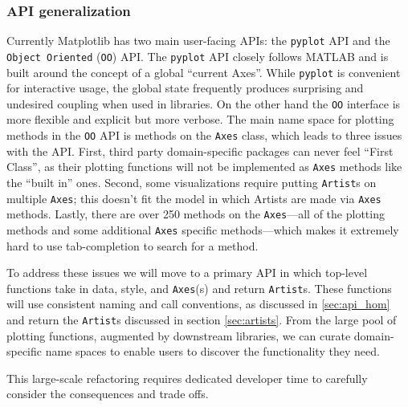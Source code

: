 \documentclass[11pt,letterpaper]{article}  %
\begin{document}
\subsubsection{API generalization}
\label{sec:api_gen}
Currently Matplotlib has two main user-facing APIs: the
\texttt{pyplot} API and the \texttt{Object Oriented} (\texttt{OO})
API.  The \texttt{pyplot} API closely follows MATLAB and is built
around the concept of a global ``current Axes''.
While
\texttt{pyplot} is convenient for interactive usage, the global
state frequently produces surprising and undesired coupling when used
in libraries.
On the other hand the \texttt{OO} interface is more flexible and
explicit but more verbose.
The main name space for plotting methods in the \texttt{OO} API is
methods on the \texttt{Axes} class, which leads to three issues with
the API.
First, third party domain-specific packages can never feel ``First
Class'', as their plotting functions will not be implemented as
\texttt{Axes} methods like the ``built in'' ones.
Second, some visualizations require putting \texttt{Artist}s on
multiple \texttt{Axes}; this doesn't fit the model in which Artists
are made via \texttt{Axes} methods.
Lastly, there are over 250 methods on the \texttt{Axes}---all of the
plotting methods and some additional \texttt{Axes} specific
methods---which makes it extremely hard to use tab-completion to
search for a method.

To address these issues we will move to a primary API in which
top-level functions take in data, style, and \texttt{Axes}(s) and
return \texttt{Artist}s.  These functions will use consistent naming
and call conventions, as discussed in \ref{sec:api_hom} and return the
\texttt{Artist}s discussed in section \ref{sec:artists}.  From the
large pool of plotting functions, augmented by downstream libraries,
we can curate domain-specific name spaces to enable users to discover
the functionality they need.

This large-scale refactoring requires dedicated developer
time to carefully consider the consequences and trade offs.

\end{document}
